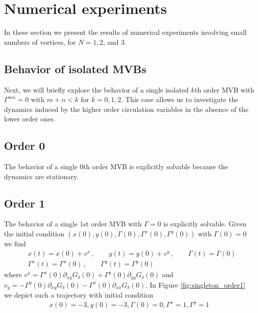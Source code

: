 \documentclass[12pt]{amsart}
\theoremstyle{remark}
\begin{document}
\section{Numerical experiments}
\label{sec:numerical_experiments}
In these section we present the results of numerical experiments involving small numbers of vortices, for $N=1,2$, and $3$.

\subsection{Behavior of isolated MVBs}
\label{sec:singles}
Next, we will briefly explore the behavior of a single isolated $k$th order MVB with $\Gamma^{mn} = 0$ with $m+n < k$ for $k=0,1,2$.
This case allows us to investigate the dynamics induced by the higher order circulation variables
in the absence of the lower order ones.

\subsection{Order 0}
The behavior of a single $0$th order MVB is explicitly solvable because the dynamics are stationary.

\subsection{Order 1}  
The behavior of a single $1$st order MVB with $\Gamma= 0$ is explicitly solvable.
Given the initial condition $(x(0) , y(0) ,  \Gamma (0) , \Gamma^x(0) , \Gamma^y(0) )$ with $\Gamma(0) = 0$ we find
\begin{align*}
	&x(t) = x(0) + v^x \,,\quad \quad y(t) = y(0) + v^y \,,\quad \quad \Gamma(t) = \Gamma(0) \\
	&\Gamma^x(t) = \Gamma^x(0)\,,\quad \quad \Gamma^y(t) = \Gamma^y(0)
\end{align*}
where $v^x = \Gamma^x(0) \partial_{xy}G_\delta(0) + \Gamma^y(0) \partial_{yy}G_\delta(0)$
and $v_y =  -\Gamma^y(0) \partial_{xy}G_\delta(0) - \Gamma^x(0) \partial_{xx}G_\delta(0)$.
In Figure \ref{fig:singleton_order1}
we depict such a trajectory with initial condition
\begin{align}
	x(0) = -3 , y(0) = -3 , \Gamma(0) = 0 , \Gamma^x = 1, \Gamma^y = 1 \label{eq:ic_order1}
\end{align}
\end{document}
